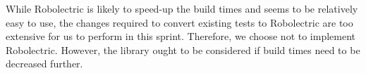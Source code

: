 While Robolectric is likely to speed-up the build times and seems to be relatively easy to use, the changes required to convert existing tests to Robolectric are too extensive for us to perform in this sprint. Therefore, we choose not to implement Robolectric. However, the library ought to be considered if build times need to be decreased further.
